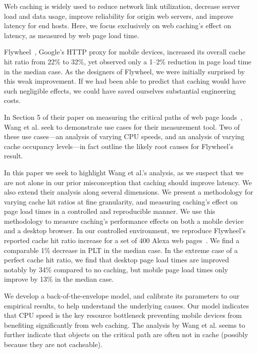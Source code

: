 \label{intro}
Web caching is widely used to reduce network link utilization, decrease server load and data usage, improve reliability for origin web servers, and improve latency for end hosts.
Here, we focus exclusively on web caching's effect on latency, as measured by web page load time.

Flywheel~\cite{flywheel}, Google's HTTP proxy for mobile devices, increased
its overall cache hit ratio from 22\% to 32\%, yet observed only a 1--2\% reduction in page load time in the median case.
As the designers of Flywheel, we were initially surprised by this weak
improvement. If we had been able to predict that caching would have such
negligible effects, we could have saved ourselves substantial engineering costs. %

In Section 5 of their paper on measuring the critical paths of web page 
loads~\cite{wang2013demystifying}, Wang et al. seek to demonstrate use 
cases for their measurement tool. Two of these use cases---an analysis of varying CPU speeds, and an analysis of varying cache occupancy levels---in fact outline the likely root causes for Flywheel's result.

In this paper we seek to highlight Wang et al.'s analysis, as we suspect that
we are not alone in our prior misconception that caching should
improve latency. We also extend
their analysis along several dimensions. We present 
a methodology for varying cache hit ratios at fine granularity,
and measuring caching's effect on page load times in a controlled and 
reproducible manner.
We use this methodology to measure caching's performance effects on both a mobile device and a desktop browser.
In our controlled environment, we reproduce Flywheel's reported cache hit
ratio increase for
a set of
400 Alexa web pages~\cite{alexa}. We find a comparable 1\% decrease in PLT in the median
case.
In the extreme case of a perfect cache hit ratio, we find that desktop page load times are improved notably by 34\% compared to no caching, but mobile page load times only improve by 13\% in the median case.

We develop a back-of-the-envelope model, and calibrate its parameters to
our empirical results, to help understand the underlying causes.
Our model indicates that CPU speed is the key resource bottleneck preventing mobile devices from benefiting significantly from web caching. 
The analysis by Wang et al. seems to further indicate that objects on the critical path are often not in cache (possibly because they are not cacheable).

